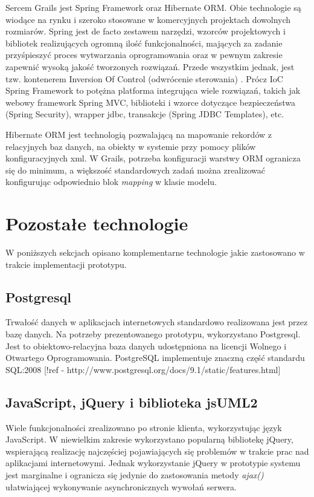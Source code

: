      Sercem Grails jest Spring Framework oraz Hibernate ORM. Obie technologie są wiodące na rynku i szeroko stosowane w komercyjnych projektach dowolnych rozmiarów. Spring jest de facto zestawem narzędzi, wzorców projektowych i bibliotek realizujących ogromną ilość funkcjonalności, mających za zadanie przyśpieszyć proces wytwarzania oprogramowania oraz w pewnym zakresie zapewnić wysoką jakość tworzonych rozwiązań. Przede wszystkim jednak, jest tzw. kontenerem Inversion Of Control (odwrócenie sterowania) \cite{MFow01}. Prócz IoC Spring Framework to potężna platforma integrująca wiele rozwiązań, takich jak webowy framework Spring MVC, biblioteki i wzorce dotyczące bezpieczeństwa (Spring Security), wrapper jdbc, transakcje (Spring JDBC Templates), etc.

      Hibernate ORM jest technologią pozwalającą na mapowanie rekordów z relacyjnych baz danych, na obiekty w systemie przy pomocy plików konfiguracyjnych xml. W Grails, potrzeba konfiguracji warstwy ORM ogranicza się do minimum, a większość standardowych zadań można zrealizować konfigurując odpowiednio blok \emph{mapping} w klasie modelu.

  \section{Pozostałe technologie}

    W poniższych sekcjach opisano komplementarne technologie jakie zastosowano w trakcie implementacji prototypu.

    \subsection{Postgresql}
      Trwałość danych w aplikacjach internetowych standardowo realizowana jest przez bazę danych. Na potrzeby prezentowanego prototypu, wykorzystano Postgresql. Jest to obiektowo-relacyjna baza danych udostępniona na licencji Wolnego i Otwartego Oprogramowania. PostgreSQL implementuje znaczną część standardu SQL:2008 [!ref - http://www.postgresql.org/docs/9.1/static/features.html]

    \subsection{JavaScript, jQuery i biblioteka jsUML2}

      Wiele funkcjonalności zrealizowano po stronie klienta, wykorzystując język JavaScript. W niewielkim zakresie wykorzystano popularną bibliotekę jQuery, wspierającą realizację najczęściej pojawiających się problemów w trakcie prac nad aplikacjami internetowymi. Jednak wykorzystanie jQuery w prototypie systemu jest marginalne i ogranicza się jedynie do zastosowania metody \emph{ajax()} ułatwiającej wykonywanie asynchronicznych wywołań serwera.

